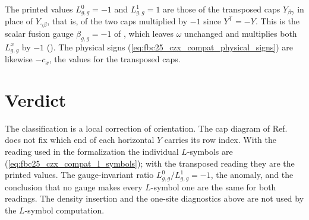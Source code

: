 \documentclass{article}
\begin{document}
The printed values $L^0_{g,g}=-1$ and $L^1_{g,g}=1$ are those of the
transposed caps $Y_{\beta\gamma}$ in place of $Y_{\gamma\beta}$, that is, of
the two caps multiplied by $-1$ since $Y^{\mathsf T}=-Y$. This is the scalar
fusion gauge $\beta_{g,g}=-1$ of , which
leaves $\omega$ unchanged and multiplies both $L^x_{g,g}$ by $-1$
(). The physical signs
(\ref{eq:fbc25_czx_compat_physical_signs}) are likewise $-c_x$, the values for
the transposed caps.

\section{Verdict}

The classification is a local correction of orientation. The cap diagram of
Ref.~\cite[lines~4671--4689]{FrancoRubio2025MPUGauging} does not fix which
end of each horizontal $Y$ carries its row index. With the reading used in
the formalization the individual $L$-symbols are
(\ref{eq:fbc25_czx_compat_l_symbols}); with the transposed reading they are
the printed values. The gauge-invariant ratio $L^0_{g,g}/L^1_{g,g}=-1$, the
anomaly, and the conclusion that no gauge makes every $L$-symbol one are the
same for both readings. The density insertion and the one-site diagnostics
above are not used by the $L$-symbol computation.
\end{document}
